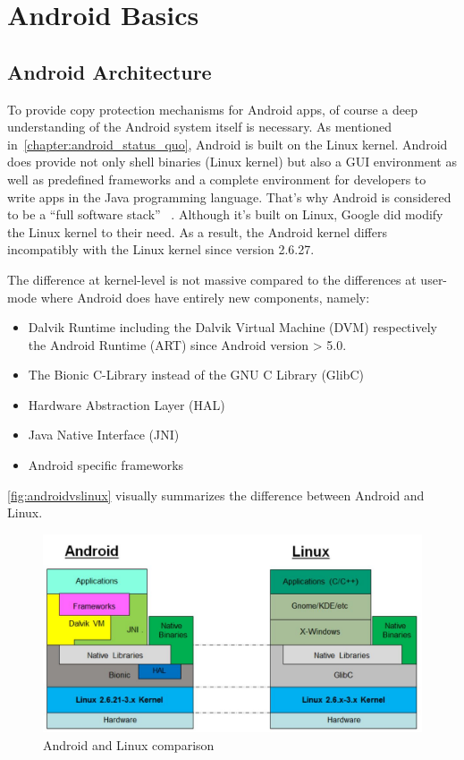 \chapter{Android Basics}\label{chapter:android_basics}

\section{Android Architecture}
To provide copy protection mechanisms for Android apps,
of course a deep understanding of the Android system itself
is necessary. As mentioned in~\autoref{chapter:android_status_quo},
Android is built on the Linux kernel. Android does provide not
only shell binaries (Linux kernel) but also a GUI environment
as well as predefined frameworks and a complete environment
for developers to write apps in the Java programming language.
That's why Android is considered to be a ``full software stack''
~\parencite{levin}. Although it's built on Linux,
Google did modify the Linux kernel to their need.
As a result, the Android kernel differs
incompatibly with the Linux kernel since version 2.6.27.

The difference at kernel-level is not massive compared to
the differences at user-mode where Android does have entirely new
components, namely:

\begin{itemize}
\item Dalvik Runtime including the Dalvik Virtual Machine (DVM)
respectively the Android Runtime (ART) since Android version > 5.0.
\item The Bionic C-Library instead of the GNU C Library (GlibC)
\item Hardware Abstraction Layer (HAL)
\item Java Native Interface (JNI)
\item Android specific frameworks
\end{itemize}

\autoref{fig:androidvslinux} visually summarizes the difference
between Android and Linux.

\begin{figure}[htb]
  \includegraphics[width=\textwidth]{figures/androidvslinux}
  \caption[Android vs Linux]{Android and Linux comparison
  ~\parencite{levin}}
  \label{fig:androidvslinux}
\end{figure}

